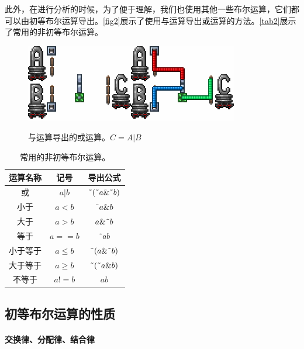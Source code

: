 此外，在进行分析的时候，为了便于理解，我们也使用其他一些布尔运算，它们都可以由初等布尔运算导出。\autoref{fig2}展示了使用与运算导出或运算的方法。\autoref{tab2}展示了常用的非初等布尔运算。

\begin{figure}[!ht]
    \centering
	\includegraphics{images/356.png}\qquad\includegraphics{images/357.png}
    \caption{与运算导出的或运算。$C=A|B$}
    \label{fig2}
\end{figure}

\begin{table}[!ht]
\centering
\begin{tabular}{|c|c|c|}
\hline
运算名称&记号&导出公式\\\hline
或&$a|b$&$\textrm{\~{}}(\textrm{\~{}}a\&\textrm{\~{}}b)$\\\hline
小于&$a<b$&$\textrm{\~{}}a\&b$\\\hline
大于&$a>b$&$a\&\textrm{\~{}}b$\\\hline
等于&$a==b$&$\textrm{\~{}}ab$\\\hline
小于等于&$a\le b$&$\textrm{\~{}}(a\&\textrm{\~{}}b)$\\\hline
大于等于&$a\ge b$&$\textrm{\~{}}(\textrm{\~{}}a\&b)$\\\hline
不等于&$a!=b$&$ab$\\\hline
\end{tabular}
\caption{常用的非初等布尔运算。}\label{tab2}
\end{table}

\subsection{初等布尔运算的性质}\label{sec9317}

\paragraph*{交换律、分配律、结合律}

